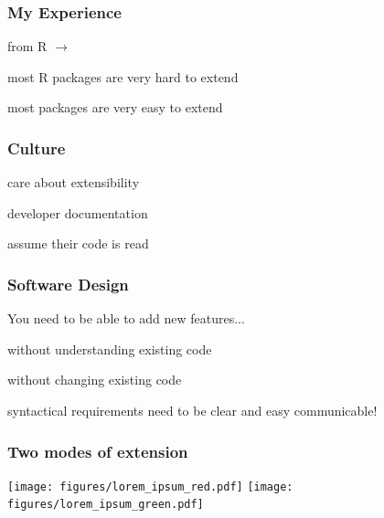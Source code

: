 \documentclass{beamer}
\newenvironment{wideitemize}{
    \itemize\addtolength{\itemsep}{15pt}\addtolength{\topsep}{10pt}}{\enditemize}
\begin{document}
    \begin{frame}
        \frametitle{My Experience}
        \vspace{0.8cm}
        \begin{wideitemize}
            \item from R $\to$ 
            \item most R packages are very hard to extend
            \item most  packages are very easy to extend
        \end{wideitemize}
    \end{frame}

    \begin{frame}
        \frametitle{Culture}
        \vspace{0.8cm}
        \begin{wideitemize}
            \item care about extensibility
            \item developer documentation
            \item assume their code is read
        \end{wideitemize}
    \end{frame}

    \begin{frame}
        \frametitle{Software Design}
        You need to be able to add new features...
        \vspace{0.8cm}
        \begin{wideitemize}
            \item without understanding existing code
            \item without changing existing code
            \item syntactical requirements need to be clear and easy communicable!
        \end{wideitemize}
    \end{frame}

    \begin{frame}
        \frametitle{Two modes of extension}
        \vspace{0.5cm}
        \texttt{[image: figures/lorem\_ipsum\_red.pdf]}%
        \texttt{[image: figures/lorem\_ipsum\_green.pdf]}
    \end{frame}
\end{document}
